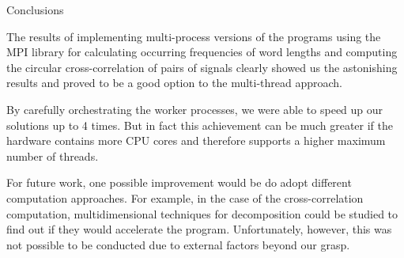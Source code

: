 \documentclass{beamer}
\begin{document}


\begin{frame}{Conclusions}

	The results of implementing multi-process versions of the programs using the MPI library for calculating occurring frequencies of word lengths and computing the circular
	cross-correlation of pairs of signals clearly showed us the astonishing results and proved to be a good option to the multi-thread approach.

	By carefully orchestrating the worker processes, we were able to speed up our solutions up to 4 times.
	But in fact this achievement can be much greater if the hardware contains more CPU cores and therefore supports a higher maximum number of threads.

	For future work, one possible improvement would be do adopt different computation approaches.
	For example, in the case of the cross-correlation computation, multidimensional techniques for decomposition could be studied to find out if they would
	accelerate the program.
	Unfortunately, however, this was not possible to be conducted due to external factors beyond our grasp.

\end{frame}
\end{document}

